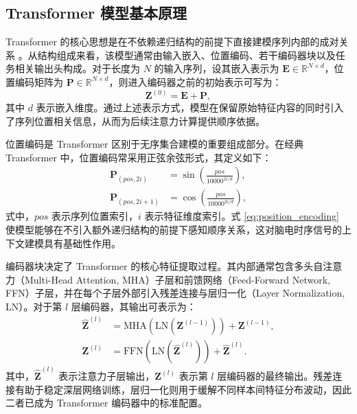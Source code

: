 \subsection{Transformer 模型基本原理}
Transformer 的核心思想是在不依赖递归结构的前提下直接建模序列内部的成对关系 \cite{vaswani2017attention}。从结构组成来看，该模型通常由输入嵌入、位置编码、若干编码器块以及任务相关输出头构成。对于长度为 $N$ 的输入序列，设其嵌入表示为 $\mathbf{E} \in \mathbb{R}^{N \times d}$，位置编码矩阵为 $\mathbf{P} \in \mathbb{R}^{N \times d}$，则进入编码器之前的初始表示可写为：
\begin{equation}
\mathbf{Z}^{(0)} = \mathbf{E} + \mathbf{P},
\label{eq:input_embed}
\end{equation}
其中 $d$ 表示嵌入维度。通过上述表示方式，模型在保留原始特征内容的同时引入了序列位置相关信息，从而为后续注意力计算提供顺序依据。

位置编码是 Transformer 区别于无序集合建模的重要组成部分。在经典 Transformer 中，位置编码常采用正弦余弦形式，其定义如下：
\begin{equation}
\begin{aligned}
\mathbf{P}_{(pos,2i)} &= \sin \left(\frac{pos}{10000^{2i/d}}\right), \\
\mathbf{P}_{(pos,2i+1)} &= \cos \left(\frac{pos}{10000^{2i/d}}\right),
\end{aligned}
\label{eq:position_encoding}
\end{equation}
式中，$pos$ 表示序列位置索引，$i$ 表示特征维度索引。式 \eqref{eq:position_encoding} 使模型能够在不引入额外递归结构的前提下感知顺序关系，这对脑电时序信号的上下文建模具有基础性作用。

编码器块决定了 Transformer 的核心特征提取过程。其内部通常包含多头自注意力（Multi-Head Attention, MHA）子层和前馈网络（Feed-Forward Network, FFN）子层，并在每个子层外部引入残差连接与层归一化（Layer Normalization, LN）。对于第 $l$ 层编码器，其输出可表示为：
\begin{equation}
\begin{aligned}
\hat{\mathbf{Z}}^{(l)} &= \text{MHA}(\text{LN}(\mathbf{Z}^{(l-1)})) + \mathbf{Z}^{(l-1)}, \\
\mathbf{Z}^{(l)} &= \text{FFN}(\text{LN}(\hat{\mathbf{Z}}^{(l)})) + \hat{\mathbf{Z}}^{(l)}.
\end{aligned}
\label{eq:encoder_block}
\end{equation}
其中，$\hat{\mathbf{Z}}^{(l)}$ 表示注意力子层输出，$\mathbf{Z}^{(l)}$ 表示第 $l$ 层编码器的最终输出。残差连接有助于稳定深层网络训练，层归一化则用于缓解不同样本间特征分布波动，因此二者已成为 Transformer 编码器中的标准配置。


